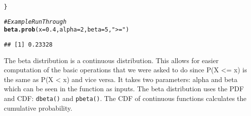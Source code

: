 \documentclass{article}\usepackage[]{graphicx}\usepackage[]{xcolor}
\makeatletter
\newcommand{\hlnum}[1]{\textcolor[rgb]{0.686,0.059,0.569}{#1}}%
\newcommand{\hlsng}[1]{\textcolor[rgb]{0.192,0.494,0.8}{#1}}%
\newcommand{\hlcom}[1]{\textcolor[rgb]{0.678,0.584,0.686}{\textit{#1}}}%
\newcommand{\hldef}[1]{\textcolor[rgb]{0.345,0.345,0.345}{#1}}%
\newcommand{\hlkwc}[1]{\textcolor[rgb]{0.333,0.667,0.333}{#1}}%
\newcommand{\hlkwd}[1]{\textcolor[rgb]{0.737,0.353,0.396}{\textbf{#1}}}%
\newenvironment{kframe}{%
 \def\at@end@of@kframe{}%
 \ifinner\ifhmode%
  \def\at@end@of@kframe{\end{minipage}}%
  \begin{minipage}{\columnwidth}%
 \fi\fi%
 \def\FrameCommand##1{\hskip\@totalleftmargin \hskip-\fboxsep
 \colorbox{shadecolor}{##1}\hskip-\fboxsep
     \hskip-\linewidth \hskip-\@totalleftmargin \hskip\columnwidth}%
 \MakeFramed {\advance\hsize-\width
   \@totalleftmargin\z@ \linewidth\hsize
   \@setminipage}}%
 {\par\unskip\endMakeFramed%
 \at@end@of@kframe}
\newenvironment{knitrout}{}{} %
\makeatother
\begin{document}
\begin{enumerate}
\begin{knitrout}
\begin{kframe}
\begin{alltt}
\hldef{\}}

\hlcom{# Example Run Through}
\hlkwd{beta.prob}\hldef{(}\hlkwc{x} \hldef{=} \hlnum{0.4}\hldef{,} \hlkwc{alpha} \hldef{=} \hlnum{2}\hldef{,} \hlkwc{beta} \hldef{=} \hlnum{5}\hldef{,} \hlsng{">="}\hldef{)}
\end{alltt}
\begin{verbatim}
## [1] 0.23328
\end{verbatim}
\end{kframe}
\end{knitrout}

The beta distribution is a continuous distribution. This allows for easier computation of the basic operations that we were asked to do since P(X <= x) is the same as P(X < x) and vice versa. It takes two parameters: alpha and beta which can be seen in the function as inputs. The beta distribution uses the PDF and CDF: \texttt{dbeta()} and \texttt{pbeta()}. The CDF of continuous functions calculates the cumulative probability.

\end{enumerate}

\end{document}
